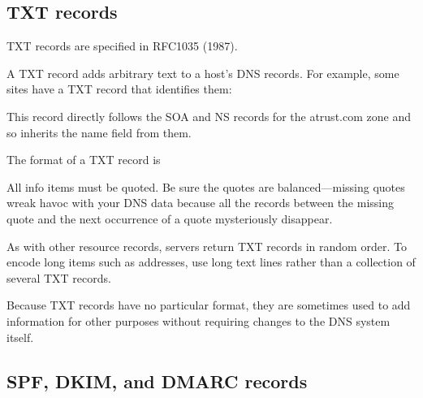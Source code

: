 \protect\hypertarget{part0024_split_030.html}{}{}

\hypertarget{part0024_split_030.htmlux5cux23_idContainer1069}{}
\hypertarget{part0024_split_030.htmlux5cux23calibre_pb_29}{%
\subsection[TXT
records]{\texorpdfstring{\protect\hypertarget{part0024_split_030.htmlux5cux23_idTextAnchor888}{}{}\protect\hypertarget{part0024_split_030.htmlux5cux23_idIndexMarker2103}{}{}TXT
records}{TXT records}}\label{part0024_split_030.htmlux5cux23calibre_pb_29}}

\leavevmode\hypertarget{part0024_split_030.htmlux5cux23_idContainer965}{}%
TXT records are specified in RFC1035 (1987).

A TXT record adds
\protect\hypertarget{part0024_split_030.htmlux5cux23_idIndexMarker2104}{}{}arbitrary
text to a host's DNS records. For example, some sites have a TXT record
that identifies them:


This record directly follows the SOA and NS records for the atrust.com
zone and so inherits the {name} field from them.

The format of a TXT record is


All {info} items must be quoted. Be sure the quotes are
balanced---missing quotes wreak havoc with your DNS data because all the
records between the missing quote and the next occurrence of a quote
mysteriously disappear.

As with other resource records, servers return TXT records in random
order. To encode long items such as addresses, use long text lines
rather than a collection of several TXT records.

Because TXT records have no particular format, they are sometimes used
to add information for other purposes without requiring changes to the
DNS system itself.

\protect\hypertarget{part0024_split_031.html}{}{}

\hypertarget{part0024_split_031.htmlux5cux23_idContainer1069}{}
\hypertarget{part0024_split_031.htmlux5cux23calibre_pb_30}{%
\subsection[SPF, DKIM, and DMARC
records]{\texorpdfstring{\protect\hypertarget{part0024_split_031.htmlux5cux23_idTextAnchor889}{}{}\protect\hypertarget{part0024_split_031.htmlux5cux23_idIndexMarker2105}{}{}\protect\hypertarget{part0024_split_031.htmlux5cux23_idTextAnchor890}{}{}SPF,
\protect\hypertarget{part0024_split_031.htmlux5cux23_idIndexMarker2106}{}{}DKIM,
and
\protect\hypertarget{part0024_split_031.htmlux5cux23_idIndexMarker2107}{}{}DMARC
records}{SPF, DKIM, and DMARC records}}\label{part0024_split_031.htmlux5cux23calibre_pb_30}}

